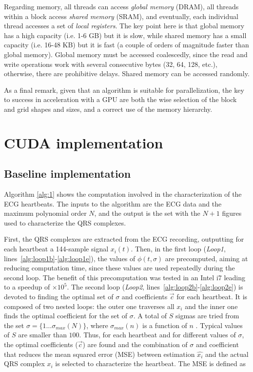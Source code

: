 \documentclass[runningheads]{llncs}
\begin{document}
Regarding memory, all threads can access \emph{global memory} (DRAM), all threads within a block access \emph{shared memory} (SRAM), and eventually, each individual thread accesses a set of \emph{local registers}. The key point here is that global memory has a high capacity (i.e. 1-6 GB) but it is slow, while shared memory has a small capacity (i.e. 16-48 KB) but it is fast (a couple of orders of magnitude faster than global memory). Global memory must be accessed coalescedly, since the read and write operations work with several consecutive bytes (32, 64, 128, etc.), otherwise, there are prohibitive delays. Shared memory can be accessed randomly. 

As a final remark, given that an algorithm is suitable for parallelization, the key to success in acceleration with a GPU are both the wise selection of the block and grid shapes and sizes, and a correct use of the memory hierarchy.

\section{CUDA implementation}\label{s:CUDA}
\subsection{Baseline implementation}
Algorithm \ref{alg:1} shows the computation involved in the characterization of the ECG heartbeats. The inputs to the algorithm are the ECG data and the maximum polynomial order $N$, and the output is the set with the $N+1$ figures used to characterize the QRS complexes.

 First, the QRS complexes are extracted from the  ECG recording, outputting for each heartbeat a 144-sample signal $x_i(t)$. Then, in the first loop (\textit{Loop1}, lines~\ref{alg:loop1b}-\ref{alg:loop1e}), the values of $\phi(t,\sigma)$ are precomputed, aiming at reducing computation time, since these values are used repeatedly during the second loop. The benefit of this precomputation was tested in an Intel i7 leading to a speedup of $\times10^5$. The second loop (\textit{Loop2}, lines~\ref{alg:loop2b}-\ref{alg:loop2e}) is devoted to finding the optimal set of $\sigma$ and coefficients $\vec{c}$ for each heartbeat. It is composed of two nested loops: the outer one traverses all $x_i$ and the inner one finds the optimal coefficient for the set of $\sigma$. A total of $S$ sigmas are tried from the set $\sigma=\{1\ldots \sigma_{max}(N)\}$, where  $\sigma_{max}(n)$ is a function of $n$ \cite{j:lagerholm00}. Typical values of $S$ are smaller than $100$. Thus, for each heartbeat and for different values of $\sigma$, the optimal coefficients ($\vec{c}$) are found and the combination of $\sigma$ and coefficient that reduces the mean squared error (MSE) between estimation $\hat{x_i}$ and the actual QRS complex $x_i$ is selected to characterize the heartbeat. The MSE is defined as
\end{document}
